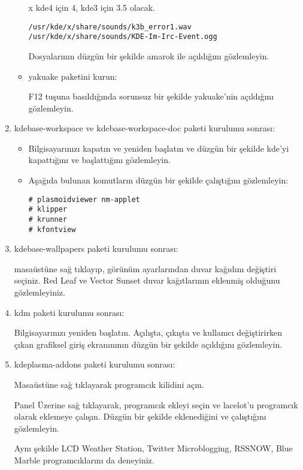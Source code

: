\documentclass[a4paper,10pt]{article}
\begin{document}
\begin{enumerate}
\begin{itemize}
x kde4 için 4, kde3 için 3.5 olacak.
\begin{verbatim}
/usr/kde/x/share/sounds/k3b_error1.wav
/usr/kde/x/share/sounds/KDE-Im-Irc-Event.ogg
\end{verbatim}

Dosyalarının düzgün bir şekilde amarok ile açıldığını gözlemleyin.

\item yakuake paketini kurun:

F12 tuşuna basıldığında sorunsuz bir şekilde yakuake'nin açıldığını gözlemleyin.
\end{itemize}
\item kdebase-workspace ve kdebase-workspace-doc paketi kurulumu sonrası:
\begin{itemize}

 \item Bilgisayarınızı kapatın ve yeniden başlatın ve düzgün bir şekilde kde'yi kapattığını ve başlattığını gözlemleyin.

 \item Aşağıda bulunan komutların düzgün bir şekilde çalıştığını gözlemleyin:
\begin{verbatim}
# plasmoidviewer nm-applet 
# klipper
# krunner
# kfontview
\end{verbatim}

\end{itemize}

\item kdebase-wallpapers paketi kurulumu sonrası:

masaüstüne sağ tıklayıp, görünüm ayarlarından duvar kağıdını değiştiri seçiniz. Red Leaf ve Vector Sunset duvar kağıtlarının eklenmiş olduğunu gözlemleyiniz.

\item kdm paketi kurulumu sonrası:

Bilgisayarınızı yeniden başlatın. Açılışta, çıkışta ve kullanıcı değiştirirken çıkan grafiksel giriş ekranınının düzgün bir şekilde açıldığını gözlemleyin.

\item kdeplasma-addons paketi kurulumu sonrası:

Masaüstüne sağ tıklayarak programcık kilidini açın.

Panel Üzerine sağ tıklayarak, programcık ekleyi seçin ve lacelot'u programcık olarak eklemeye çalışın. Düzgün bir şekilde eklenediğini ve çalıştığını gözlemleyin.

Aynı şekilde LCD Weather Station, Twitter Microblogging, RSSNOW, Blue Marble programcıklarını da deneyiniz.


\end{enumerate}
\end{document}
